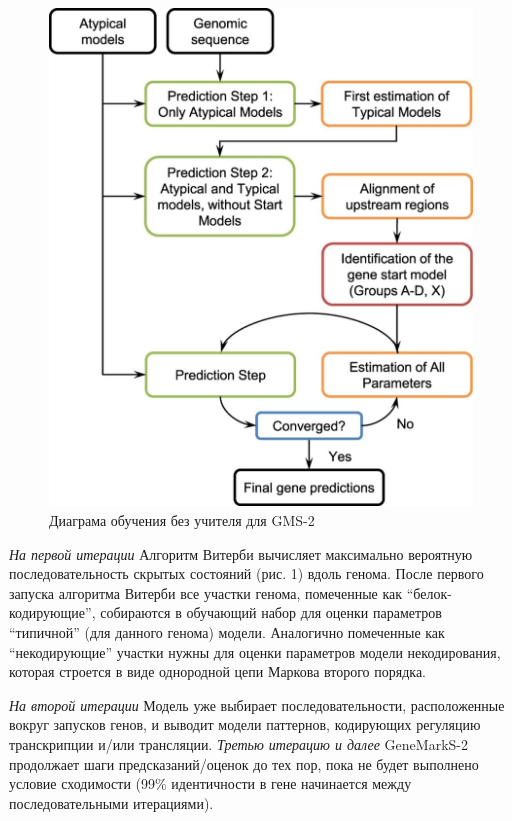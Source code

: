 \documentclass[14pt]{extarticle}
\begin{document}
    \begin{figure}[]
            \centering
            \includegraphics[width=\textwidth]{img/gms2_2.jpg}
            \caption{Диаграма обучения без учителя для GMS-2 \cite{lomsad}}
            \label{fig:skybox}
    \end{figure}
    
    
    \par{\textit{На первой итерации} Алгоритм Витерби вычисляет максимально вероятную 
    последовательность скрытых состояний (рис. 1) вдоль генома. После первого запуска
    алгоритма Витерби все участки генома, помеченные как ``белок-кодирующие'', собираются в обучающий набор для оценки 
    параметров ``типичной'' (для данного генома) модели. Аналогично помеченные как ``некодирующие'' участки нужны для 
    оценки параметров модели некодирования, которая строется в виде однородной цепи Маркова второго порядка.}
    
    
    \par{\textit{На второй итерации} Модель уже выбирает последовательности, расположенные вокруг запусков генов, 
    и выводит модели паттернов, кодирующих регуляцию транскрипции и/или трансляции. \textit{Третью итерацию и 
    далее} GeneMarkS-2 продолжает шаги предсказаний/оценок до тех пор, пока не 
    будет выполнено условие сходимости (99\% идентичности в гене начинается между последовательными итерациями).}
    
\end{document}
